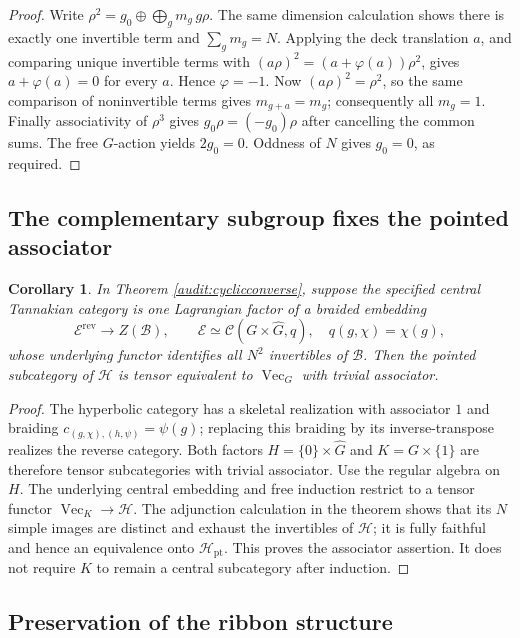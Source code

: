 \documentclass[11pt,a4paper]{article}
\numberwithin{equation}{section}
\newtheorem{corollary}[theorem]{Corollary}
\theoremstyle{definition}\newtheorem{definition}[theorem]{Definition}
\theoremstyle{remark}\newtheorem{remark}[theorem]{Remark}
\begin{document}
\begin{proof}
Write
$\rho^2=g_0\oplus\bigoplus_g m_g\,g\rho$.
The same dimension calculation shows there is exactly one
invertible term and $\sum_gm_g=N$.
Applying the deck translation $a$, and comparing unique invertible
terms with
$(a\rho)^2=(a+\varphi(a))\rho^2$, gives
$a+\varphi(a)=0$ for every $a$. Hence $\varphi=-1$.
Now $(a\rho)^2=\rho^2$, so the same comparison of noninvertible
terms gives $m_{g+a}=m_g$; consequently all $m_g=1$.
Finally associativity of $\rho^3$ gives
$g_0\rho=(-g_0)\rho$ after cancelling the common sums.
The free $G$-action yields $2g_0=0$. Oddness of $N$ gives $g_0=0$,
as required.
\end{proof}

\subsection{The complementary subgroup fixes the pointed associator}

\begin{corollary}\label{audit:untwisted}
In Theorem \ref{audit:cyclicconverse}, suppose the specified central
Tannakian category is one Lagrangian factor of a braided embedding
\[
 \mathcal E^{\mathrm{rev}}\longrightarrow Z(\mathcal B),\qquad
 \mathcal E\simeq\mathcal C(G\times\widehat G,q),\quad
 q(g,\chi)=\chi(g),
\]
whose underlying functor identifies all $N^2$ invertibles of
$\mathcal B$. Then the pointed subcategory of $\mathcal H$ is
tensor equivalent to $\operatorname{Vec}_G$ with trivial associator.
\end{corollary}
\begin{proof}
The hyperbolic category has a skeletal realization with associator $1$
and braiding
$c_{(g,\chi),(h,\psi)}=\psi(g)$; replacing this braiding by its
inverse-transpose realizes the reverse category.
Both factors $H=\{0\}\times\widehat G$ and
$K=G\times\{1\}$ are therefore tensor subcategories with trivial
associator. Use the regular algebra on $H$.
The underlying central embedding and free induction restrict to a
tensor functor $\operatorname{Vec}_K\to\mathcal H$.
The adjunction calculation in the theorem shows that its $N$ simple
images are distinct and exhaust the invertibles of $\mathcal H$;
it is fully faithful and hence an equivalence onto
$\mathcal H_{\mathrm{pt}}$. This proves the associator assertion.
It does not require $K$ to remain a central subcategory after induction.
\end{proof}

\subsection{Preservation of the ribbon structure}
\end{document}
